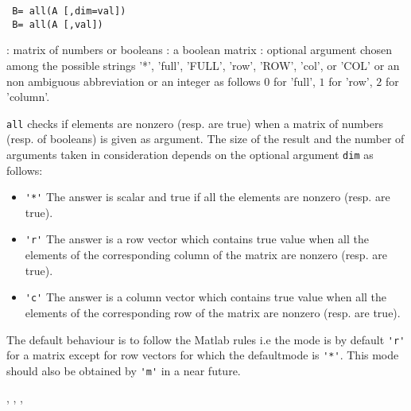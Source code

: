 \begin{mandesc}
\end{mandesc}

\begin{calling_sequence}
\begin{verbatim}
 B= all(A [,dim=val])
 B= all(A [,val])
\end{verbatim}
\end{calling_sequence}
\begin{parameters}
  \begin{varlist}
    :  matrix of numbers or booleans 
    : a boolean matrix 
    : optional argument chosen among the possible strings '*', 
    'full', 'FULL', 'row', 'ROW', 'col', or 'COL'  or an non ambiguous abbreviation or an 
    integer as follows $0$ for 'full', $1$ for 'row', $2$ for 'column'.
  \end{varlist}
\end{parameters}

\begin{mandescription}
  \verb!all! checks if elements are nonzero (resp. are true) when a matrix of numbers (resp. of booleans) 
  is given as argument. The size of the result and the number of arguments taken in consideration depends 
  on the optional argument \verb!dim! as follows:
  \begin{itemize}
  \item \verb!'*'! The answer is scalar and true if all the elements are nonzero (resp. are true).
  \item \verb!'r'! The answer is a row vector which contains true value when all the elements of 
    the corresponding column of the matrix are  nonzero (resp. are true). 
  \item \verb!'c'! The answer is a column vector which contains true value when all the elements of 
    the corresponding row of the matrix are  nonzero (resp. are true).
  \end{itemize}
  The default behaviour is to follow the Matlab rules i.e the mode is by default \verb!'r'! 
  for a matrix except for row vectors for which the defaultmode is \verb!'*'!. 
  This mode should also be obtained by \verb!'m'! in a near future. 
\end{mandescription}
\begin{manseealso}
  , , , 
\end{manseealso}


